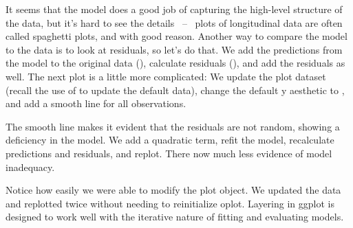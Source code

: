 % 


It seems that the model does a good job of capturing the high-level structure of the data, but it's hard to see the details ~--~ plots of longitudinal data are often called spaghetti plots, and with good reason.  Another way to compare the model to the data is to look at residuals, so let's do that.  We add the predictions from the model to the original data (), calculate residuals (), and add the residuals as well.  The next plot is a little more complicated: We update the plot dataset (recall the use of \code{\%+\%} to update the default data), change the default y aesthetic to , and add a smooth line for all observations.

% 
% 


The smooth line makes it evident that the residuals are not random, showing a deficiency in the model.  We add a quadratic term, refit the model, recalculate predictions and residuals, and replot.  There now much less evidence of model inadequacy.

% 
% 


Notice how easily we were able to modify the plot object.  We updated the data and replotted twice without needing to reinitialize oplot.  Layering in ggplot is designed to work well with the iterative nature of fitting and evaluating models.


